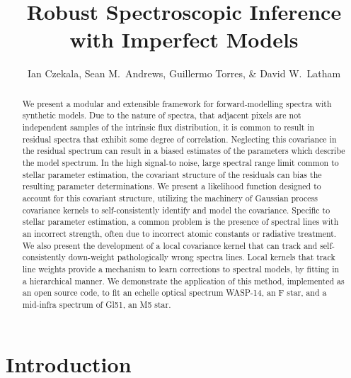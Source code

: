 \documentclass[iop,floatfix]{emulateapj}
\begin{document}
\graphicspath{{figs/}}



\title{Robust Spectroscopic Inference with Imperfect Models}
\author{Ian Czekala, Sean M.~Andrews, Guillermo Torres, \& David W.~Latham}

\begin{abstract}
We present a modular and extensible framework for forward-modelling spectra with synthetic models. Due to the nature of spectra, that adjacent pixels are not independent samples of the intrinsic flux distribution, it is common to result in residual spectra that exhibit some degree of correlation. Neglecting this covariance in the residual spectrum can result in a biased estimates of the parameters which describe the model spectrum. In the high signal-to noise, large spectral range limit common to stellar parameter estimation, the covariant structure of the residuals can bias the resulting parameter determinations. We present a likelihood function designed to account for this covariant structure, utilizing the machinery of Gaussian process covariance kernels to self-consistently identify and model the covariance. Specific to stellar parameter estimation, a common problem is the presence of spectral lines with an incorrect strength, often due to incorrect atomic constants or radiative treatment. We also present the development of a local covariance kernel that can track and self-consistently down-weight pathologically wrong spectra lines. Local kernels that track line weights provide a mechanism to learn corrections to spectral models, by fitting in a hierarchical manner. We demonstrate the application of this method, implemented as an open source code, to fit an echelle optical spectrum WASP-14, an F star, and a mid-infra spectrum of Gl51, an M5 star. 
\end{abstract}


\section{Introduction} \label{sec:intro}
\end{document}
